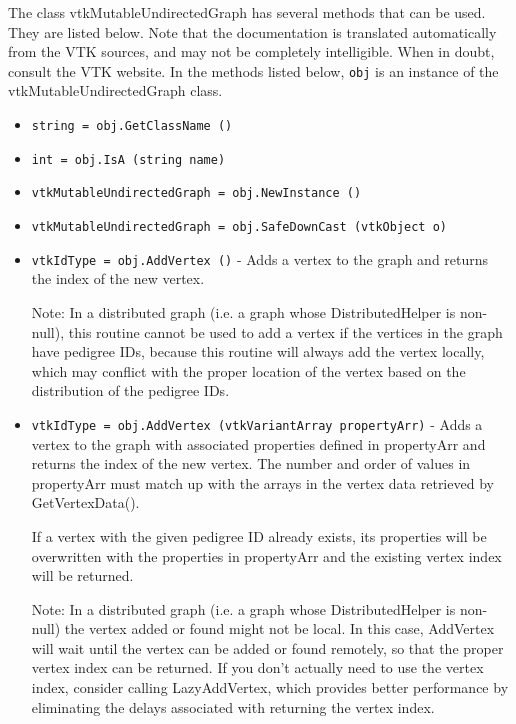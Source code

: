 The class vtkMutableUndirectedGraph has several methods that can be used.
  They are listed below.
Note that the documentation is translated automatically from the VTK sources,
and may not be completely intelligible.  When in doubt, consult the VTK website.
In the methods listed below, \verb|obj| is an instance of the vtkMutableUndirectedGraph class.
\begin{itemize}
\item  \verb|string = obj.GetClassName ()|

\item  \verb|int = obj.IsA (string name)|

\item  \verb|vtkMutableUndirectedGraph = obj.NewInstance ()|

\item  \verb|vtkMutableUndirectedGraph = obj.SafeDownCast (vtkObject o)|

\item  \verb|vtkIdType = obj.AddVertex ()| -  Adds a vertex to the graph and returns the index of the new vertex.

 Note: In a distributed graph (i.e. a graph whose DistributedHelper
 is non-null), this routine cannot be used to add a vertex
 if the vertices in the graph have pedigree IDs, because this routine
 will always add the vertex locally, which may conflict with the
 proper location of the vertex based on the distribution of the
 pedigree IDs.

\item  \verb|vtkIdType = obj.AddVertex (vtkVariantArray propertyArr)| -  Adds a vertex to the graph with associated properties defined in
  propertyArr and returns the index of the new vertex.
 The number and order of values in  propertyArr must match up with the
 arrays in the vertex data retrieved by GetVertexData().

 If a vertex with the given pedigree ID already exists, its properties will be
 overwritten with the properties in  propertyArr and the existing
 vertex index will be returned.

 Note: In a distributed graph (i.e. a graph whose DistributedHelper
 is non-null) the vertex added or found might not be local. In this case,
 AddVertex will wait until the vertex can be added or found
 remotely, so that the proper vertex index can be returned. If you
 don't actually need to use the vertex index, consider calling
 LazyAddVertex, which provides better performance by eliminating
 the delays associated with returning the vertex index.


\end{itemize}
